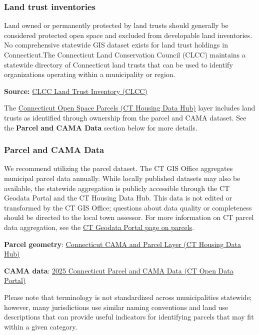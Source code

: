 \documentclass[
  letterpaper,
  DIV=11,
  numbers=noendperiod]{scrreprt}
\begin{document}
\subsubsection{Land trust inventories}\label{sec-land-trust-inventories}

Land owned or permanently protected by land trusts should generally be
considered protected open space and excluded from developable land
inventories. No comprehensive statewide GIS dataset exists for land
trust holdings in Connecticut.The Connecticut Land Conservation Council
(CLCC) maintains a statewide directory of Connecticut land trusts that
can be used to identify organizations operating within a municipality or
region.

\textbf{Source:}
\href{https://ctconservation.org/what-is-a-land-trust/\#maps}{CLCC Land
Trust Inventory (CLCC)}

The
\href{https://housingmaps.ct.gov/datasets/ctmaps::connecticut-protected-open-space-parcels/about}{Connecticut
Open Space Parcels (CT Housing Data Hub)} layer includes land trusts as
identified through ownership from the parcel and CAMA dataset. See the
\textbf{Parcel and CAMA Data} section below for more details.

\subsubsection{Parcel and CAMA Data}\label{sec-parcel-and-cama-data2}

We recommend utilizing the parcel dataset. The CT GIS Office aggregates
municipal parcel data annually. While locally published datasets may
also be available, the statewide aggregation is publicly accessible
through the CT Geodata Portal and the CT Housing Data Hub. This data is
not edited or transformed by the CT GIS Office; questions about data
quality or completeness should be directed to the local town assessor.
For more information on CT parcel data aggregation, see the
\href{https://geodata.ct.gov/pages/parcels}{CT Geodata Portal page on
parcels}.

\textbf{Parcel geometry}:
\href{https://housingmaps.ct.gov/datasets/ctmaps::connecticut-cama-and-parcel-layer/about}{Connecticut
CAMA and Parcel Layer (CT Housing Data Hub)}

\textbf{CAMA data}:
\href{https://data.ct.gov/Local-Government/2025-Connecticut-Parcel-and-CAMA-Data/rny9-6ak2/about_data}{2025
Connecticut Parcel and CAMA Data (CT Open Data Portal)}

\begin{tcolorbox}[enhanced jigsaw, arc=.35mm, bottomrule=.15mm, breakable, colback=white, colframe=quarto-callout-warning-color-frame, left=2mm, leftrule=.75mm, opacityback=0, rightrule=.15mm, toprule=.15mm]

Please note that terminology is not standardized across municipalities
statewide; however, many jurisdictions use similar naming conventions
and land use descriptions that can provide useful indicators for
identifying parcels that may fit within a given category.

\end{tcolorbox}
\end{document}
